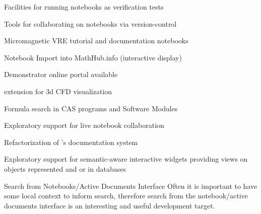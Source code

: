\begin{workpackage}
\begin{wpdelivs}
  \begin{wpdeliv}[due=18,id=jupyter-test,dissem=PU,nature=OTHER,lead=SR]
      {Facilities for running notebooks as verification tests}
  \end{wpdeliv}

  \begin{wpdeliv}[due=12,id=jupyter-collab,dissem=PU,nature=OTHER,lead=SR]
      {Tools for collaborating on notebooks via version-control}
  \end{wpdeliv}
    \begin{wpdeliv}[due=21,id=oommf-nb-documentation,dissem=PU,nature=DEC,lead=USO]
      {Micromagnetic VRE tutorial and documentation notebooks}
    \end{wpdeliv}
    \begin{wpdeliv}[id=jupyter-import,due=24,nature=DEM,dissem=PU,lead=JU]
      {Notebook Import into MathHub.info (interactive display)}
    \end{wpdeliv}
    \begin{wpdeliv}[due=24,id=oommf-nb-tmp,dissem=PU,nature=DEC,lead=USO]
      {Demonstrator online portal available}
    \end{wpdeliv}
  \begin{wpdeliv}[due=24,id=cfd-vis,dissem=PU,nature=OTHER]
      {\Jupyter extension for 3d CFD visualization}
  \end{wpdeliv}
   \begin{wpdeliv}[id=cassearch,due=30,nature=OTHER,dissem=PU,lead=JU]
      {Formula search in CAS programs and Software Modules}
    \end{wpdeliv}
  \begin{wpdeliv}[due=36,id=jupyter-live-collab,dissem=PU,nature=OTHER,lead=SR]
      {Exploratory support for live notebook collaboration}
  \end{wpdeliv}
  \begin{wpdeliv}[due=24,id=sage-sphinx,dissem=PU,nature=OTHER]
      {Refactorization of \Sage's \Sphinx documentation system}
  \end{wpdeliv}
  \begin{wpdeliv}[due=36,id=ipython-advanced-interacts,dissem=PU,nature=DEM]
      {Exploratory support for semantic-aware interactive widgets providing views on objects
      represented and or in databases}
  \end{wpdeliv}
\begin{wpdeliv}[id=nbad-search,due=42,nature=OTHER,dissem=PU,lead=JU]
  {Search from Notebooks/Active Documents Interface} Often it is important to have some
  local context to inform search, therefore search from the notebook/active documents
  interface is an interesting and useful development target.
\end{wpdeliv}


\end{wpdelivs}
\end{workpackage}
